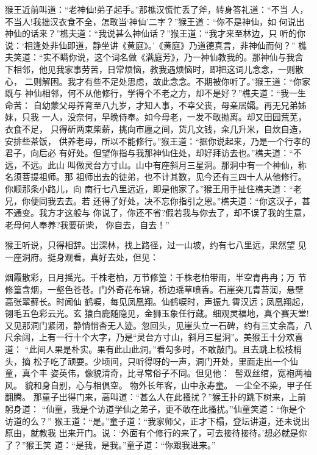 猴王近前叫道：“老神仙!弟子起手。”那樵汉慌忙丢了斧，转身答礼道：“不当
人，不当人!我拙汉衣食不全，怎敢当‘神仙’二字？”猴王道：“你不是神仙，如
何说出神仙的话来？”樵夫道：“我说甚么神仙话？”猴王道：“我才来至林边，只
听的你说：‘相逢处非仙即道，静坐讲《黄庭》。’《黄庭》乃道德真言，非神仙而何？”
樵夫笑道：“实不瞒你说，这个词名做《满庭芳》，乃一神仙教我的。那神仙与我舍
下相邻，他见我家事劳苦，日常烦恼，教我遇烦恼时，即把这词儿念念，一则散心，
二则解困。我才有些不足处思虑，故此念念。不期被你听了。”猴王道：“你家既与
神仙相邻，何不从他修行，学得个不老之方，却不是好？”樵夫道：“我一生命苦：
自幼蒙父母养育至八九岁，才知人事，不幸父丧，母亲居孀。再无兄弟姊妹，只我
一人，没奈何，早晚侍奉。如今母老，一发不敢抛离。却又田园荒芜，衣食不足，
只得斫两束柴薪，挑向市廛之间，货几文钱，籴几升米，自炊自造，安排些茶饭，
供养老母，所以不能修行。”猴王道：“据你说起来，乃是一个行孝的君子，向后必
有好处。但望你指与我那神仙住处，却好拜访去也。”樵夫道：“不远，不远。此山
叫做灵台方寸山。山中有座斜月三星洞。那洞中有一个神仙，称名须菩提祖师。那
祖师出去的徒弟，也不计其数，见今还有三四十人从他修行。你顺那条小路儿，向
南行七八里远近，即是他家了。”猴王用手扯住樵夫道：“老兄，你便同我去去。若
还得了好处，决不忘你指引之恩。”樵夫道：“你这汉子，甚不通变。我方才这般与
你说了，你还不省?假若我与你去了，却不误了我的生意，老母何人奉养?我要斫柴，
你自去，自去！”

猴王听说，只得相辞。出深林，找上路径，过一山坡，约有七八里远，果然望
见一座洞府。挺身观看，真好去处，但见：

烟霞散彩，日月摇光。千株老柏，万节修篁：千株老柏带雨，半空青冉冉；万
节修篁含烟，一壑色苍苍。门外奇花布锦，桥边瑶草喷香。石崖突兀青苔润，悬壁
高张翠藓长。时闻仙
鹤唳，每见凤凰翔。仙鹤唳时，声振九霄汉远；凤凰翔起，翎毛五色彩云光。玄
猿白鹿随隐见，金狮玉象任行藏。细观灵福地，真个赛天堂!
又见那洞门紧闭，静悄悄杳无人迹。忽回头，见崖头立一石碑，约有三丈余高，八
尺余阔，上有一行十个大字，乃是“灵台方寸山，斜月三星洞”。美猴王十分欢喜道：
“此间人果是朴实。果有此山此洞。”看勾多时，不敢敲门。且去跳上松枝梢头，摘
松子吃了顽耍。少顷间，只听得呀的一声，洞门开处，里面走出一个仙童，真个丰
姿英伟，像貌清奇，比寻常俗子不同。但见他：
髻双丝绾，宽袍两袖风。
貌和身自别，心与相俱空。
物外长年客，山中永寿童。
一尘全不染，甲子任翻腾。
那童子出得门来，高叫道：“甚么人在此搔扰？”猴王扑的跳下树来，上前躬身道：
“仙童，我是个访道学仙之弟子，更不敢在此搔扰。”仙童笑道：“你是个访道的么？”
猴王道：“是。”童子道：“我家师父，正才下榻，登坛讲道，还未说出原由，就教我
出来开门。说：‘外面有个修行的来了，可去接待接待。’想必就是你了？”猴王笑
道：“是我，是我。”童子道：“你跟我进来。”

